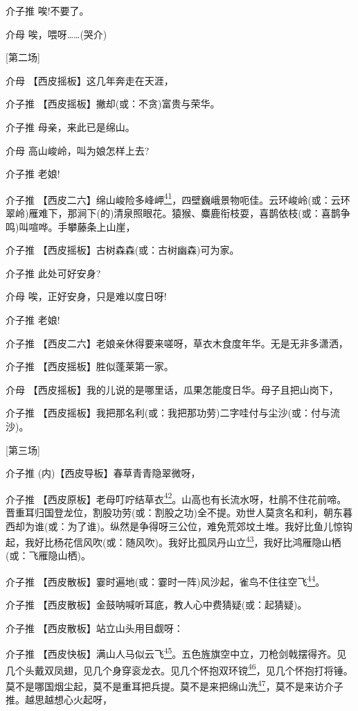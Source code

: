 介子推 唉!不要了。

介母 唉，喂呀\ldots{}\ldots{}(哭介)

{[}第二场{]}

介母 【西皮摇板】这几年奔走在天涯，

介子推 【西皮摇板】撇却(或：不贪)富贵与荣华。

介子推 母亲，来此已是绵山。

介母 高山峻岭，叫为娘怎样上去?

介子推 老娘!

介子推
【西皮二六】绵山峻险多峰岬\protect\hyperlink{fn41}{\textsuperscript{41}}，四壁巍峨景物呃佳。云环峻岭(或：云环翠岭)雁难下，那涧下(的)清泉照眼花。猿猴、麋鹿衔枝耍，喜鹊依枝(或：喜鹊争鸣)叫喧哗。手攀藤条上山崖，

介子推 【西皮摇板】古树森森(或：古树幽森)可为家。

介子推 此处可好安身?

介母 唉，正好安身，只是难以度日呀!

介子推 老娘!

介子推 【西皮二六】老娘亲休得要来嗟呀，草衣木食度年华。无是无非多潇洒，

介子推 【西皮摇板】胜似蓬莱第一家。

介母 【西皮摇板】我的儿说的是哪里话，瓜果怎能度日华。母子且把山岗下，

介子推
【西皮摇板】我把那名利(或：我把那功劳)二字哇付与尘沙(或：付与流沙)。

{[}第三场{]}

介子推 (内)【西皮导板】春草青青隐翠微呀，

介子推
【西皮原板】老母叮咛结草衣\protect\hyperlink{fn42}{\textsuperscript{42}}。山高也有长流水呀，杜鹃不住花前啼。晋重耳归国登龙位，割股功劳(或：割股之功)全不提。劝世人莫贪名和利，朝东暮西却为谁(或：为了谁)。纵然是争得呀三公位，难免荒郊坟土堆。我好比鱼儿惊钩起，我好比杨花信风吹(或：随风吹)。我好比孤凤丹山立\protect\hyperlink{fn43}{\textsuperscript{43}}，我好比鸿雁隐山栖(或：飞雁隐山栖)。

介子推
【西皮散板】霎时遍地(或：霎时一阵)风沙起，雀鸟不住往空飞\protect\hyperlink{fn44}{\textsuperscript{44}}。

介子推 【西皮散板】金鼓呐喊听耳底，教人心中费猜疑(或：起猜疑)。

介子推 【西皮散板】站立山头用目觑呀：

介子推
【西皮快板】满山人马似云飞\protect\hyperlink{fn45}{\textsuperscript{45}}。五色旌旗空中立，刀枪剑戟摆得齐。见几个头戴双凤翅，见几个身穿衮龙衣。见几个怀抱双环镋\protect\hyperlink{fn46}{\textsuperscript{46}}，见几个怀抱打将锤。莫不是哪国烟尘起，莫不是重耳把兵提。莫不是来把绵山洗\protect\hyperlink{fn47}{\textsuperscript{47}}，莫不是来访介子推。越思越想心火起呀，

